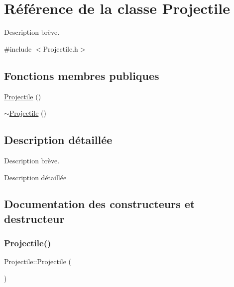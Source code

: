 \hypertarget{class_projectile}{}\section{Référence de la classe Projectile}
\label{class_projectile}


Description brève.  




{\ttfamily \#include $<$Projectile.\+h$>$}

\subsection*{Fonctions membres publiques}
\begin{DoxyCompactItemize}
\item 
\hyperlink{class_projectile_ac536ed2aad56af866a2078b9a85aa16d}{Projectile} ()
\item 
\hyperlink{class_projectile_a94903e021fa2edab60ba3836ca0b937d}{$\sim$\+Projectile} ()
\end{DoxyCompactItemize}


\subsection{Description détaillée}
Description brève. 

Description détaillée 

\subsection{Documentation des constructeurs et destructeur}
\mbox{\label{class_projectile_ac536ed2aad56af866a2078b9a85aa16d}} 
\subsubsection{\texorpdfstring{Projectile()}{Projectile()}}
{\footnotesize\ttfamily Projectile\+::\+Projectile (\begin{DoxyParamCaption}{ }\end{DoxyParamCaption})}

\mbox{\label{class_projectile_a94903e021fa2edab60ba3836ca0b937d}} 
